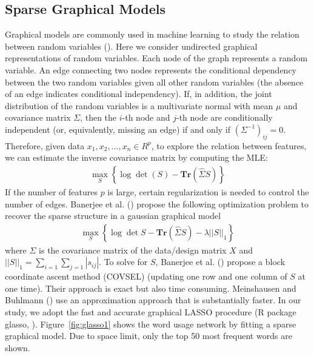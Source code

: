 \documentclass[11pt]{article}
\newcommand{\note}[1]{{\em \color{red} #1}}
\newcommand{\1}[1]{{\mathbf 1}\left\{#1\right\}}        %
\def\lp{\left(}
\def\rp{\right)}
\begin{document}
\subsection{Sparse Graphical Models}
Graphical models are commonly used in machine learning to study the relation between random variables (\cite{wainwright2008graphical}). Here we consider undirected graphical representations of random variables. Each node of the graph represents a random variable. An edge connecting two nodes represents the conditional dependency between the two random variables given all other random variables (the absence of an edge indicates conditional independency). If, in addition, the joint distribution of the random variables is a multivariate normal with mean $\mu$ and covariance matrix $\Sigma$, then the $i$-th node and $j$-th node are conditionally independent (or, equivalently, missing an edge) if and only if $(\Sigma^{-1})_{ij} = 0$. Therefore, given data $x_1,x_2,...,x_n\in R^p$, to explore the relation between features, we can estimate the inverse covariance matrix by computing the MLE:   
\begin{align}
\label{eq:mle}
\max_S \left\{  \log \det \lp S\rp - \textbf{Tr}( \hat{\Sigma}S)  \right\}
\end{align}
If the number of features $p$ is large, certain regularization is needed to control the number of edges. Banerjee et al. (\cite{banerjee2008model}) propose the following optimization problem to recover the sparse structure in a gaussian graphical model
\begin{align}
\label{eq:gLasso}
\max_S \left\{ \log \det S - \textbf{Tr} \lp \hat{\Sigma}S \rp - \lambda ||S||_1 \right\}
\end{align}
where $\Sigma$ is the covariance matrix of the data/design matrix $X$ and $||S||_1 = \sum_{i=1}\sum_{j=1} |s_{ij}|$. To solve for $S$,  Banerjee et al. (\cite{banerjee2008model}) propose a block coordinate ascent method (COVSEL) (updating one row and one column of $S$ at one time). Their approach is exact but also time consuming. Meinshausen and Buhlmann (\cite{meinshausen2006high}) use an approximation approach that is substantially faster. In our study, we adopt the fast and accurate graphical LASSO procedure ({\sffamily R} package {\sffamily glasso}, \cite{Rglasso}). Figure~\ref{fig:glasso1} shows the word usage network by fitting a sparse graphical model. Due to space limit, only the top 50 most frequent words are shown.

\end{document}
